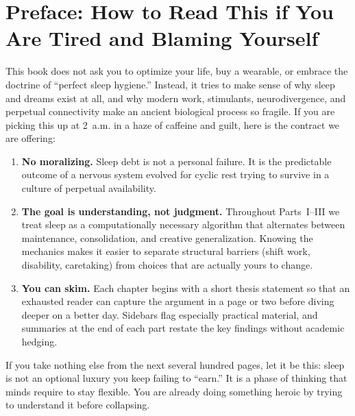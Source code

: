 \chapter*{Preface: How to Read This if You Are Tired and Blaming Yourself}\label{ch:preface}
\noindent This book does not ask you to optimize your life, buy a wearable, or embrace the doctrine of ``perfect sleep hygiene.''
Instead, it tries to make sense of why sleep and dreams exist at all, and why modern work, stimulants, neurodivergence, and
perpetual connectivity make an ancient biological process so fragile. If you are picking this up at 2~a.m. in a haze of caffeine
and guilt, here is the contract we are offering:

\begin{enumerate}
    \item \textbf{No moralizing.} Sleep debt is not a personal failure. It is the predictable outcome of a nervous system evolved
    for cyclic rest trying to survive in a culture of perpetual availability.
    \item \textbf{The goal is understanding, not judgment.} Throughout Parts~I--III we treat sleep as a computationally necessary
    algorithm that alternates between maintenance, consolidation, and creative generalization. Knowing the mechanics makes it
    easier to separate structural barriers (shift work, disability, caretaking) from choices that are actually yours to change.
    \item \textbf{You can skim.} Each chapter begins with a short thesis statement so that an exhausted reader can capture the
    argument in a page or two before diving deeper on a better day. Sidebars flag especially practical material, and summaries at
    the end of each part restate the key findings without academic hedging.
\end{enumerate}

If you take nothing else from the next several hundred pages, let it be this: sleep is not an optional luxury you keep failing to
``earn.'' It is a phase of thinking that minds require to stay flexible. You are already doing something heroic by trying to
understand it before collapsing.
